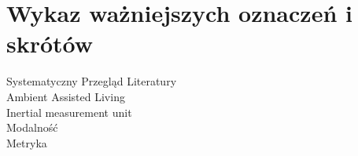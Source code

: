 \chapter*{Wykaz ważniejszych oznaczeń i skrótów}

\begin{description}
	\item [Systematyczny Przegląd Literatury] 
	\item [Ambient Assisted Living]
	\item [Inertial measurement unit]
	\item [Modalność]
	\item [Metryka]
\end{description}
